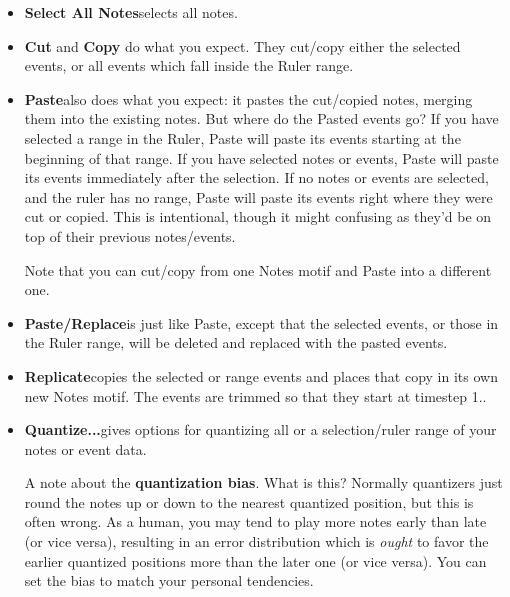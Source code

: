 \documentclass[twoside,10pt]{article}
\begin{document}
\begin{itemize}


\item{\bf Select All Notes}\quad selects all notes.

\item{\bf Cut} and {\bf Copy} do what you expect.  They cut/copy either the selected events, or all events which fall inside the Ruler range.

\item {\bf Paste}\quad also does what you expect: it pastes the cut/copied notes, merging them into the existing notes.  But where do the Pasted events go?  If you have selected a range in the Ruler, Paste will paste its events starting at the beginning of that range.  If you have selected notes or events, Paste will paste its events immediately after the selection.  If no notes or events are selected, and the ruler has no range, Paste will paste its events right where they were cut or copied.  This is intentional, though it might confusing as they'd be on top of their previous notes/events.

Note that you can cut/copy from one Notes motif and Paste into a different one.

\item {\bf Paste/Replace}\quad is just like Paste, except that the selected events, or those in the Ruler range, will be deleted and replaced with the pasted events.

\item {\bf Replicate}\quad copies the selected or range events and places that copy in its own new Notes motif.  The events are trimmed so that they start at timestep 1..

\item{\bf Quantize...}\quad gives options for quantizing all or a selection/ruler range of your notes or event data. 

 A note about  the {\bf quantization bias}.  What is this?  Normally quantizers just round the notes up or down to the nearest quantized position, but this is often wrong.  As a human, you may tend to play more notes early than late (or vice versa), resulting in an error distribution which is {\it ought} to favor the earlier quantized positions more than the later one (or vice versa).  You can set the bias to match your personal tendencies.


\end{itemize}
\end{document}
